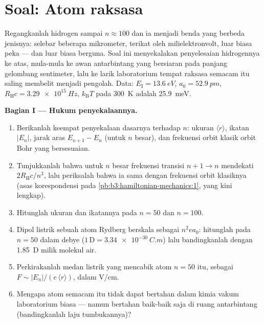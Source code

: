 \section{Soal: Atom raksasa}

\begin{problem}\label{pb:b3:hydrogen-atom:1}
Regangkanlah hidrogen sampai $n \approx 100$ dan ia menjadi benda yang
berbeda jenisnya: selebar beberapa mikrometer, terikat oleh
milielektronvolt, luar biasa peka --- dan luar biasa berguna. Soal ini
menyekalakan penyelesaian hidrogennya ke atas, mula-mula ke awan
antarbintang yang bersiaran pada panjang gelombang sentimeter, lalu ke
larik laboratorium tempat raksasa semacam itu saling membelit menjadi
pengolah. Data:
$E_{\text{I}} = \qty{13.6}{eV}$, $a_0 = \qty{52.9}{pm}$,
$R_{\text{H}}c = \qty{3.29e15}{Hz}$, $k_{\text{B}}T$ pada
\qty{300}{K} adalah \qty{25.9}{meV}.

\medskip\noindent\textbf{Bagian I --- Hukum penyekalaannya.}
\begin{enumerate}
  \item Berikanlah keempat penyekalaan dasarnya terhadap $n$: ukuran
        $\langle
        r\rangle$, ikatan $|E_n|$, jarak aras $E_{n+1} - E_n$ (untuk
        $n$ besar), dan frekuensi orbit klasik orbit Bohr yang
        bersesuaian.
  \item Tunjukkanlah bahwa untuk $n$ besar frekuensi transisi $n+1 \to
        n$ mendekati $2R_{\text{H}}c/n^3$, lalu periksalah bahwa ia sama
        dengan frekuensi orbit klasiknya (asas korespondensi pada
        \cref{pb:b3:hamiltonian-mechanics:1}, yang kini lengkap).
  \item Hitunglah ukuran dan ikatannya pada $n = 50$ dan $n = 100$.
  \item Dipol listrik sebuah atom Rydberg berskala sebagai $n^2ea_0$:
        hitunglah pada $n = 50$ dalam debye ($1\,\text{D} =
        \qty{3.34e-30}{C.m}$) lalu bandingkanlah dengan \qty{1.85}{D}
        milik molekul air.
  \item Perkirakanlah medan listrik yang mencabik atom $n = 50$ itu,
        sebagai $F \sim |E_n|/(e\,\langle r\rangle)$, dalam V/cm.
  \item Mengapa atom semacam itu tidak dapat bertahan dalam kimia vakum
        laboratorium biasa --- namun bertahan baik-baik saja di ruang
        antarbintang (bandingkanlah laju tumbukannya)?
\end{enumerate}


\end{problem}
